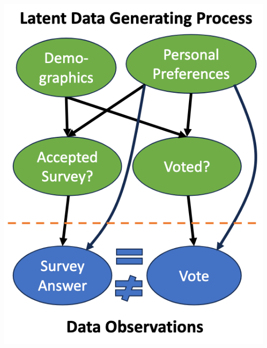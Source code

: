 \documentclass[11pt]{article}
\theoremstyle{definition}
\begin{document}
\includegraphics[width=\textwidth/4]{14.png}
\end{document}
